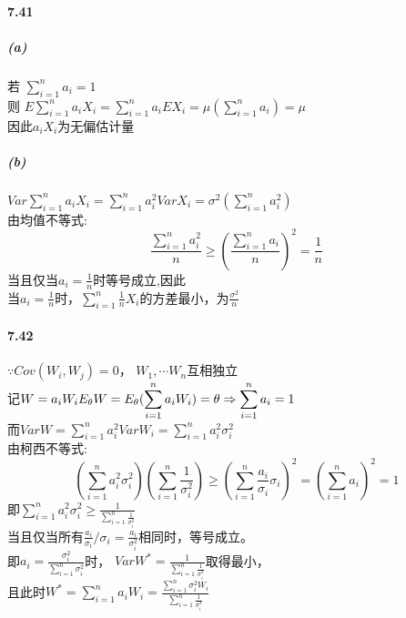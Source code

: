 \documentclass[11pt,a4paper]{ctexart}
\title{\vspace{-5ex}}
\author{基科32 曾柯又 2013012266}
\date{\vspace{-5ex}}
\begin{document}
\abovedisplayskip=5pt
\belowdisplayskip=5pt
\abovedisplayshortskip=0pt
\belowdisplayshortskip=0pt
\maketitle
\paragraph{7.41}
\subparagraph{(a)}
若 \(\sum_{i = 1}^{n}a_i = 1\)\\
则 \(E\sum_{i= 1}^{n }a_iX_i = \sum_{i = 1}^{n}a_iEX_i = \mu(\sum_{i = 1}^{n}a_i) = \mu\)\\
因此\(a_iX_i\)为无偏估计量
\subparagraph{(b)}
\(\displaystyle Var\sum_{i = 1}^{n}a_iX_i = \sum_{i = 1}^{n}a_i^2VarX_i = \sigma^2(\sum_{i= 1}^{n}a_i^2)\)\\
由均值不等式:\[\frac{\sum_{i = 1}^{n}a_i^2}{n}\geq (\frac{\sum_{i = 1}^{n}a_i}{n})^2 = \frac{1}{n}\]
当且仅当\(a_i = \frac{1}{n} \)时等号成立,因此\\
当\(a_i = \frac{1}{n} \)时，\(\sum_{i = 1}^{n}\frac{1}{n}X_i\)的方差最小，为\(\frac{\sigma^2}{n}\)
\paragraph{7.42}
\(\because Cov(W_i,W_j)  = 0\)， \(W_1 , \cdots W_n\)互相独立\\
记\(\displaystyle 
W =a_iW_i\\
E_{\theta} W= E_{\theta}(\sum_{i = 1}^{n}a_iW_i) = \theta \Rightarrow \sum_{i = 1}^{n}a_i = 1\)\\
而\(VarW = \sum_{i=1}^{n}a_i^2VarW_i = \sum_{i = 1}^{n}a_i^2\sigma_i^2\)\\
由柯西不等式:
\[(\sum_{i = 1}^{n}a_i^2\sigma_i^2)(\sum_{i = 1}^{n}\frac{1}{\sigma_i^2}) \geq (\sum_{i = 1}^{n}\frac{a_i}{\sigma_i}\sigma_i)^2 = (\sum_{i = 1}^{n}a_i)^2 = 1\]
即\(\displaystyle \sum_{i = 1}^{n}a_i^2\sigma_i^2 \geq \frac{1}{\sum_{i = 1}^{n}\frac{1}{\sigma_i^2}}\)\\
当且仅当所有\(\displaystyle \frac{a_i}{\sigma_i}\big/\sigma_i = \frac{a_i}{\sigma_i^2}\)相同时，等号成立。\\
即\(\displaystyle a_i = \frac{\sigma_i^2}{\sum_{i = 1}^{n}\sigma_i^2}\)时，
\(\displaystyle VarW^* = \frac{1}{\sum_{i = 1}^{n}\frac{1}{\sigma^2_i}}\)取得最小，\\
且此时\(\displaystyle W^* = \sum_{i = 1}^{n}a_iW_i = \frac{\sum_{i = 1}^{n}\sigma_i^2W_i}{\sum_{i = 1}^{n}\frac{1}{\sigma_i^2}}\)
\end{document}
